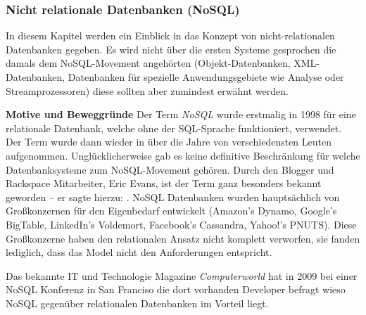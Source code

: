 \subsubsection{Nicht relationale Datenbanken (NoSQL)}
\label{subsec:nichtrelationaleDB}

In diesem Kapitel werden ein Einblick in das Konzept von nicht-relationalen Datenbanken gegeben. Es wird nicht über die ersten Systeme gesprochen die damals dem NoSQL-Movement angehörten (Objekt-Datenbanken, XML-Datenbanken, Datenbanken für spezielle Anwendungsgebiete wie Analyse oder Streamprozessoren) diese sollten aber zumindest erwähnt werden.

\textbf{Motive und Beweggründe\newline}
Der Term \textit{NoSQL} wurde erstmalig in 1998 für eine relationale Datenbank, welche ohne der SQL-Sprache funktioniert, verwendet\cite{MELD.CH2-noSQL.firstSQLNaming}. Der Term wurde dann wieder in über die Jahre von verschiedensten Leuten aufgenommen. Unglücklicherweise gab es keine definitive Beschränkung für welche Datenbanksysteme zum NoSQL-Movement gehören. Durch den Blogger und Rackspace Mitarbeiter, Eric Evans, ist der Term ganz besonders bekannt geworden – er sagte hierzu: \cite[\textit{“the whole point of seeking alternatives is that you need to solve a problem that relational databases are a bad fit for”}]{MELD.CH2-noSQL.whatsInAName}. NoSQL Datenbanken wurden hauptsächlich von Großkonzernen für den Eigenbedarf entwickelt (Amazon’s Dynamo, Google’s BigTable, LinkedIn’s Voldemort, Facebook’s Cassandra, Yahoo!’s PNUTS). Diese Großkonzerne haben den relationalen Ansatz nicht komplett verworfen, sie fanden lediglich, dass das Model nicht den Anforderungen entspricht\cite{MELD.CH2-noSQL.capTheoremComp}.

Das bekannte IT und Technologie Magazine \textit{Computerworld} hat in 2009 bei einer NoSQL Konferenz in San Franciso die dort vorhanden Developer befragt wieso NoSQL gegenüber relationalen Datenbanken im Vorteil liegt\cite{MELD.CH2-noSQL.whyItsBetter}.

